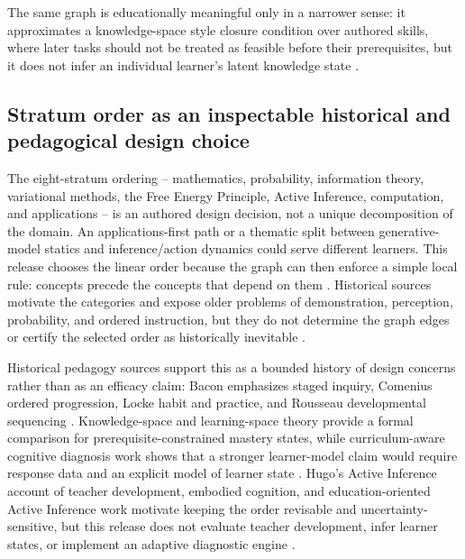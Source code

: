 \documentclass[
  english,
]{article}
\begin{document}
The same graph is educationally meaningful only in a narrower sense: it
approximates a knowledge-space style closure condition over authored
skills, where later tasks should not be treated as feasible before their
prerequisites, but it does not infer an individual learner's latent
knowledge state
\citep{doignon1985knowledge_spaces, falmagne2011learning_spaces}.

\subsection{Stratum order as an inspectable historical and pedagogical
design
choice}\label{stratum-order-as-an-inspectable-historical-and-pedagogical-design-choice}

The eight-stratum ordering -- mathematics, probability, information
theory, variational methods, the Free Energy Principle, Active
Inference, computation, and applications -- is an authored design
decision, not a unique decomposition of the domain. An
applications-first path or a thematic split between generative-model
statics and inference/action dynamics could serve different learners.
This release chooses the linear order because the graph can then enforce
a simple local rule: concepts precede the concepts that depend on them
\citep{bloom1956taxonomy, bloom1968learning_for_mastery, liang2018prerequisite}.
Historical sources motivate the categories and expose older problems of
demonstration, perception, probability, and ordered instruction, but
they do not determine the graph edges or certify the selected order as
historically inevitable
\citep{aristotle_posterior_analytics, alhazen1989optics_direct_vision, quintilian95institutio_oratoria, huygens1657ratiociniis}.

Historical pedagogy sources support this as a bounded history of design
concerns rather than as an efficacy claim: Bacon emphasizes staged
inquiry, Comenius ordered progression, Locke habit and practice, and
Rousseau developmental sequencing
\citep{bacon1620novum_organum, comenius1657great_didactic, locke1693education, rousseau1762emile}.
Knowledge-space and learning-space theory provide a formal comparison
for prerequisite-constrained mastery states, while curriculum-aware
cognitive diagnosis work shows that a stronger learner-model claim would
require response data and an explicit model of learner state
\citep{doignon1985knowledge_spaces, falmagne2011learning_spaces, fu2025curriculum_aware_gncd}.
Hugo's Active Inference account of teacher development, embodied
cognition, and education-oriented Active Inference work motivate keeping
the order revisable and uncertainty-sensitive, but this release does not
evaluate teacher development, infer learner states, or implement an
adaptive diagnostic engine
\citep{hugo2026teacher_development, clark2016surfing, dipaolo2024school}.
\end{document}
